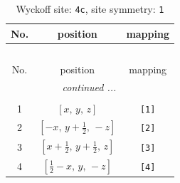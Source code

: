 \documentclass[fleqn,8pt]{jsarticle}
\begin{document}
\renewcommand{\arraystretch}{1.2}
\begin{longtable}{ccc}
\caption{Wyckoff site: {\tt 4c}, site symmetry: {\tt 1}}
 \\
 \hline \hline
No. & position & mapping \\ \hline \endfirsthead

\multicolumn{2}{l}{\tablename\ \thetable{}} \\
 \hline \hline
No. & position & mapping \\ \hline \endhead

 \hline \hline
\multicolumn{2}{r}{\footnotesize\it continued ...} \\ \endfoot

 \hline \hline
\multicolumn{2}{r}{} \\ \endlastfoot

1 & $\left[ x,\, y,\, z \right]$ & {\tt [1]} \\ \hline
2 & $\left[ - x,\, y + \frac{1}{2},\, - z \right]$ & {\tt [2]} \\ \hline
3 & $\left[ x + \frac{1}{2},\, y + \frac{1}{2},\, z \right]$ & {\tt [3]} \\ \hline
4 & $\left[ \frac{1}{2} - x,\, y,\, - z \right]$ & {\tt [4]} \\
\end{longtable}
\end{document}
